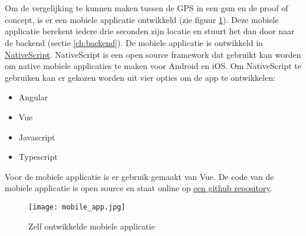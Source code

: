 \section{}
\label{ch:mobileapp}
Om de vergelijking te kunnen maken tussen de GPS in een gsm en de proof of concept, is er een mobiele applicatie ontwikkeld (zie figuur \ref{fig:mobileapp}). Deze mobiele applicatie berekent iedere drie seconden zijn locatie en stuurt het dan door naar de backend (sectie \ref{ch:backend}). De mobiele applicatie is ontwikkeld in \href{https://www.nativescript.org/}{NativeScript}. NativeScript is een open source framework dat gebruikt kan worden om native mobiele applicaties te maken voor Android en iOS. Om NativeScript te gebruiken kan er gekozen worden uit vier opties om de app te ontwikkelen:
\begin{itemize}
	\item Angular
	\item Vue
	\item Javascript
	\item Typescript
\end{itemize}
Voor de mobiele applicatie is er gebruik gemaakt van Vue. De code van de mobiele applicatie is open source en staat online op \underline{\href{https://github.com/IndyVC/bap-gsmtracker}{een github repository}}. 
\begin{figure}
	\texttt{[image: mobile\_app.jpg]}
	\caption{Zelf ontwikkelde mobiele applicatie}
	\label{fig:mobileapp}
\end{figure}